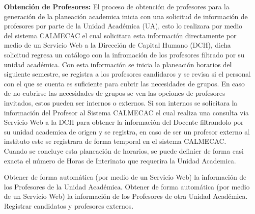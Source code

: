 

\begin{PDescripcion}
	\Ppaso \textbf{Obtención de Profesores:} El proceso de obtención de profesores para la generación de la planeación academica inicia con una solicitud de información de profesores por parte de la Unidad Académica (UA), esto lo realizara por medio del sistema CALMECAC el cual solicitara esta información directamente por medio de un Servicio Web a la Dirección de Capital Humano (DCH), dicha solicitud regresa un catálogo con la infromación de los profesores filtrado por su unidad académica. 
	Con esta información se inicia la planeación horarios del siguiente semestre, se registra a los profesores candidaros y se revisa si el personal con el que se cuenta es suficiente para cubrir las necesidades de grupos. 
	En caso de no cubrirse las necesidades de grupos se ven las opciones de profesores invitados, estos pueden ser internos o externos.
	Si son internos se solicitara la información del Profesor al Sistema CALMECAC el cual realiza una consulta via Servicio Web a la DCH para obtener la información del Docente filtrandolo por su unidad academica de origen y se registra, en caso de ser un profesor externo al instituto este se registrara de forma temporal en el sistema CALMECAC. 
	Cuando se concluye esta planeación de horarios, se puede definier de forma casi exacta el número de Horas de Interinato que requerira la Unidad Academica.     
\end{PDescripcion}

\begin{FCDescripcion}
	\FCpaso Obtener de forma automática (por medio de un Servicio Web) la información de los Profesores de la Unidad Académica. 
	\FCpaso Obtener de forma automática (por medio de un Servicio Web) la información de los Profesores de otra Unidad Académica. 
	\FCpaso Registrar candidatos y profesores externos. 
\end{FCDescripcion}
